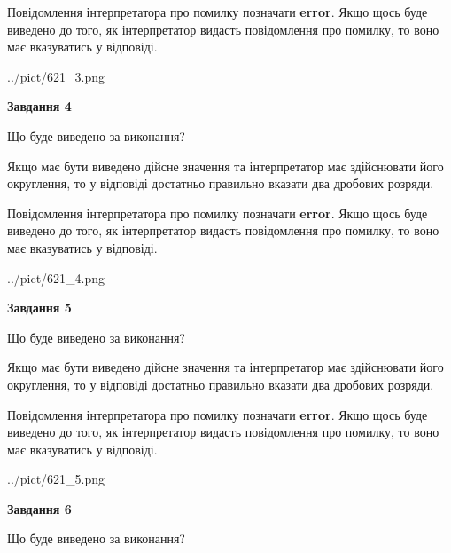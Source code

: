 \documentclass[12pt, ukrainian]{article}
\begin{document}
{\begin {Large}
Повідомлення інтерпретатора про помилку позначати \textbf{error}.
Якщо щось буде виведено до того, як інтерпретатор видасть повідомлення про помилку, 
то воно має вказуватись у відповіді. \par

\begin{center}
	{../pict/621_3.png}
\end{center}
\newpage

{\begin {center}\textbf{Завдання 4}\end {center}}\par
Що буде виведено за виконання? \par

Якщо має бути виведено дійсне значення та інтерпретатор має здійснювати його округлення, 
то у відповіді достатньо правильно вказати два дробових розряди.

Повідомлення інтерпретатора про помилку позначати \textbf{error}.
Якщо щось буде виведено до того, як інтерпретатор видасть повідомлення про помилку, 
то воно має вказуватись у відповіді. \par

\begin{center}
	{../pict/621_4.png}
\end{center}
\newpage

{\begin {center}\textbf{Завдання 5}\end {center}}\par
Що буде виведено за виконання? \par

Якщо має бути виведено дійсне значення та інтерпретатор має здійснювати його округлення, 
то у відповіді достатньо правильно вказати два дробових розряди.

Повідомлення інтерпретатора про помилку позначати \textbf{error}.
Якщо щось буде виведено до того, як інтерпретатор видасть повідомлення про помилку, 
то воно має вказуватись у відповіді. \par

\begin{center}
	{../pict/621_5.png}
\end{center}
\newpage

{\begin {center}\textbf{Завдання 6}\end {center}}\par
Що буде виведено за виконання? \par


\end{Large}}
\end{document}
